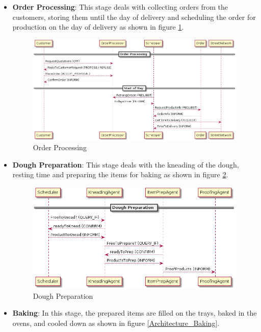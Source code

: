 \documentclass[11pt, a4paper]{article}
\begin{document}
\begin{itemize}
	\item \textbf{Order Processing}: This stage deals with collecting orders from the customers, storing them until the day of delivery and scheduling the order for production on the day of delivery as shown in figure \ref{Architecture_OrderProcessing}.

\begin{figure}[h!]
	\centering
	\includegraphics[scale=0.4]{../Architecture/Architecture_OrderProcessing.png}
	\caption{Order Processing}
	\label{Architecture_OrderProcessing}
\end{figure}	
	
	\item \textbf{Dough Preparation}: This stage deals with the kneading of the dough, resting time and preparing the items for baking  as shown in figure \ref{Architecture_DoughPreparation}.
	
\begin{figure}[h!]
	\centering
	\includegraphics[scale=0.5]{../Architecture/Architecture_DoughPreparation.png}
	\caption{Dough Preparation}
	\label{Architecture_DoughPreparation}
\end{figure}	
	
	\item \textbf{Baking}: In this stage, the prepared items are filled on the trays, baked in the ovens, and cooled down  as shown in figure \ref{Architecture_Baking}.


\end{itemize}
\end{document}
